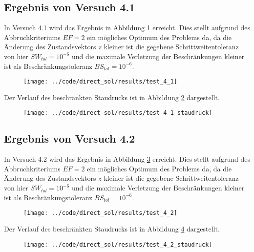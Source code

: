 \subsection{Ergebnis von Versuch 4.1}\label{kap:Versuch41}
In Versuch 4.1 wird das Ergebnis in Abbildung \ref{img:test_4_1} erreicht. Dies stellt aufgrund des Abbruchkriteriums $EF = 2$ ein mögliches Optimum des Problems da, da die Änderung des Zustandsvektors $z$ kleiner ist die gegebene Schrittweitentoleranz von hier $SW_{tol} = 10^{-6}$ und die maximale Verletzung der Beschränkungen kleiner ist als Beschränkungstoleranz $BS_{tol} = 10^{-6}$.
\begin{figure}[H]
\begin{center}
\texttt{[image: ../code/direct\_sol/results/test\_4\_1]}
 \label{img:test_4_1}
\end{center}
\end{figure}
Der Verlauf des beschränkten Staudrucks ist in Abbildung \ref{img:test_4_1_staudruck} dargestellt.
\begin{figure}[H]
\begin{center}
\texttt{[image: ../code/direct\_sol/results/test\_4\_1\_staudruck]}
 \label{img:test_4_1_staudruck}
\end{center}
\end{figure}




\subsection{Ergebnis von Versuch 4.2}\label{kap:Versuch42}
In Versuch 4.2 wird das Ergebnis in Abbildung \ref{img:test_4_2} erreicht. Dies stellt aufgrund des Abbruchkriteriums $EF = 2$ ein mögliches Optimum des Problems da, da die Änderung des Zustandsvektors $z$ kleiner ist die gegebene Schrittweitentoleranz von hier $SW_{tol} = 10^{-6}$ und die maximale Verletzung der Beschränkungen kleiner ist als Beschränkungstoleranz $BS_{tol} = 10^{-6}$.
\begin{figure}[H]
\begin{center}
\texttt{[image: ../code/direct\_sol/results/test\_4\_2]}
 \label{img:test_4_2}
\end{center}
\end{figure}
Der Verlauf des beschränkten Staudrucks ist in Abbildung \ref{img:test_4_2_staudruck} dargestellt.
\begin{figure}[H]
\begin{center}
\texttt{[image: ../code/direct\_sol/results/test\_4\_2\_staudruck]}
 \label{img:test_4_2_staudruck}
\end{center}
\end{figure}